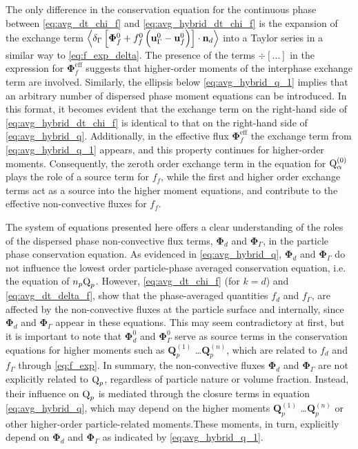 \documentclass[11pt]{My_preprint}
\begin{document}
The only difference in the conservation equation for the continuous phase between \eqref{eq:avg_dt_chi_f} and \eqref{eq:avg_hybrid_dt_chi_f} is the expansion of the exchange term $\left<\delta_\Gamma \left[
    \mathbf{\Phi}_f^0
    + f_f^0
    \left(
        \textbf{u}_\Gamma ^0
        - \textbf{u}_f^0
    \right)
\right]
\cdot \textbf{n}_d\right>$ into a Taylor series in a similar way to \ref{eq:f_exp_delta}. 
The presence of the terms $\div[\ldots]$ in the expression for  $\mathbf{\Phi}_f^\text{eff}$ suggests that higher-order moments of the interphase exchange term are involved.
Similarly, the ellipsis below \ref{eq:avg_hybrid_q_1} implies that an arbitrary number of dispersed phase moment equations can be introduced. In this format, it becomes evident that the exchange term on the right-hand side of \ref{eq:avg_hybrid_dt_chi_f} is identical to that on the right-hand side of \ref{eq:avg_hybrid_q}. 
Additionally, in the effective flux $\mathbf{\Phi}_f^\text{eff}$ the exchange term from  \ref{eq:avg_hybrid_q_1} appears, and this property continues for higher-order moments.  
Consequently, the zeroth order exchange term in the equation for $\text Q_\alpha^{(0)}$ plays the role of a source term for $f_f$, while the first and higher order exchange terms act as a source into the higher moment equations, and contribute to the effective non-convective fluxes for $f_f$. 



The system of equations presented here offers a clear understanding of the roles of the dispersed phase non-convective flux terms, $\bm\Phi_d$ and $\bm\Phi_\Gamma$, in the particle phase conservation equation. 
As evidenced in \ref{eq:avg_hybrid_q}, $\bm{\Phi}_d$ and $\bm{\Phi}_\Gamma$  do not influence the lowest order particle-phase averaged conservation equation, i.e. the equation of $n_p \text Q_p$. 
However, \ref{eq:avg_dt_chi_f} (for $k = d$) and \ref{eq:avg_dt_delta_f}, show that the phase-averaged quantities $f_d$ and $f_\Gamma$, are affected by the non-convective fluxes at the particle surface and internally, since $\bm{\Phi}_d$ and $\bm{\Phi}_\Gamma$ appear in these equations.
This may seem contradictory at first, but it is important to note that $\bm{\Phi}_d^0$ and $\bm{\Phi}_\Gamma^0$ serve as source terms in the conservation equations for higher moments such as $\textbf{Q}^{(1)}_p$ \ldots $\textbf{Q}^{(n)}_p$, which are related to $f_d$ and $f_\Gamma$ through \ref{eq:f_exp}.
In summary, the non-convective fluxes $\bm{\Phi}_d$ and $\bm{\Phi}_\Gamma$  are not explicitly related to $\text Q_p$, regardless of particle nature or volume fraction. 
Instead, their influence on $\text Q_p$ is mediated through the closure terms in equation \ref{eq:avg_hybrid_q}, which may depend on the higher moments $\textbf{Q}^{(1)}_p$ \ldots $\textbf{Q}^{(n)}_p$ or other higher-order particle-related moments.These moments, in turn, explicitly depend on $\bm{\Phi}_d$ and $\bm{\Phi}_\Gamma$ as indicated by \ref{eq:avg_hybrid_q_1}. 
\end{document}
